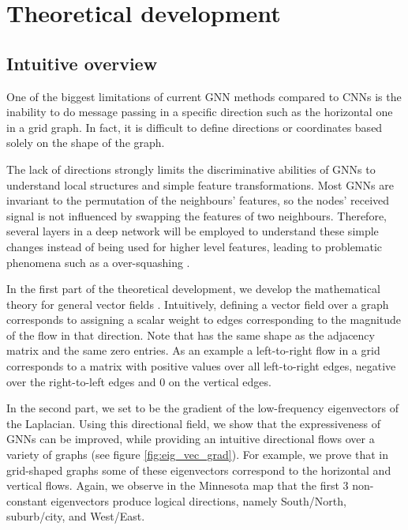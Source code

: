 \documentclass{article} \usepackage{arxiv,times}
\begin{document}
\section{Theoretical development}

\subsection{Intuitive overview}

One of the biggest limitations of current GNN methods compared to CNNs is the inability to do message passing in a specific direction such as the horizontal one in a grid graph. In fact, it is difficult to define directions or coordinates based solely on the shape of the graph. 

The lack of directions strongly limits the discriminative abilities of GNNs to understand local structures and simple feature transformations. 
Most GNNs are invariant to the permutation of the neighbours' features, so the nodes' received signal is not influenced by swapping the features of two neighbours. Therefore, several layers in a deep network will be employed to understand these simple changes instead of being used for higher level features, leading to problematic phenomena such as a  over-squashing \cite{alon_bottleneck_2020}. 



In the first part of the theoretical development, we develop the mathematical theory for general vector fields . Intuitively, defining a vector field over a graph corresponds to assigning a scalar weight to edges corresponding to the magnitude of the flow in that direction. Note that  has the same shape as the adjacency matrix and the same zero entries. As an example a left-to-right flow in a grid corresponds to a matrix with positive values over all left-to-right edges, negative over the right-to-left edges and 0 on the vertical edges.

In the second part, we set  to be the gradient of the low-frequency eigenvectors of the Laplacian. Using this directional field, we show that the expressiveness of GNNs can be improved, while providing an intuitive directional flows over a variety of graphs (see figure \ref{fig:eig_vec_grad}). For example, we prove that in grid-shaped graphs some of these eigenvectors correspond to the horizontal and vertical flows. Again, we observe in the Minnesota map that the first 3 non-constant eigenvectors produce logical directions, namely South/North, suburb/city, and West/East.
\end{document}
